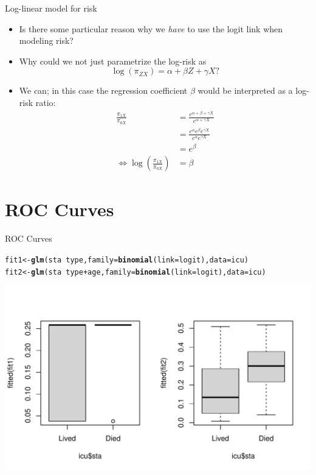 \documentclass[10pt,handout]{beamer}\usepackage[]{graphicx}\usepackage[]{color}
\makeatletter
\def\maxwidth{ %
  \ifdim\Gin@nat@width>\linewidth
    \linewidth
  \else
    \Gin@nat@width
  \fi
}
\newcommand{\hlopt}[1]{\textcolor[rgb]{0,0,0}{#1}}%
\newcommand{\hlstd}[1]{\textcolor[rgb]{0.345,0.345,0.345}{#1}}%
\newcommand{\hlkwb}[1]{\textcolor[rgb]{0.69,0.353,0.396}{#1}}%
\newcommand{\hlkwc}[1]{\textcolor[rgb]{0.333,0.667,0.333}{#1}}%
\newcommand{\hlkwd}[1]{\textcolor[rgb]{0.737,0.353,0.396}{\textbf{#1}}}%
\newenvironment{kframe}{%
 \def\at@end@of@kframe{}%
 \ifinner\ifhmode%
  \def\at@end@of@kframe{\end{minipage}}%
  \begin{minipage}{\columnwidth}%
 \fi\fi%
 \def\FrameCommand##1{\hskip\@totalleftmargin \hskip-\fboxsep
 \colorbox{shadecolor}{##1}\hskip-\fboxsep
     \hskip-\linewidth \hskip-\@totalleftmargin \hskip\columnwidth}%
 \MakeFramed {\advance\hsize-\width
   \@totalleftmargin\z@ \linewidth\hsize
   \@setminipage}}%
 {\par\unskip\endMakeFramed%
 \at@end@of@kframe}
\newenvironment{knitrout}{}{} %
\makeatother
\begin{document}
\begin{frame}[fragile]{Log-linear model for risk}
	\begin{itemize}
		\item Is there some particular reason why we \textit{have} to use the logit link when modeling risk?
		\item Why could we not just parametrize the log-risk as
		$$
		\log(\pi_{ZX}) = \alpha + \beta Z + \gamma X ?
		$$
		\item We can; in this case the regression coefficient $\beta$ would be interpreted as a log-risk ratio:
		$$\begin{aligned}
		\frac{\pi_{1 X}}{\pi_{0 X}} &=\frac{e^{\alpha+\beta+\gamma X}}{e^{\alpha+\gamma X}} \\
		&=\frac{e^{\alpha} e^{\beta} e^{\gamma X}}{e^{\alpha} e^{\gamma X}} \\
		&=e^{\beta} \\
		\Leftrightarrow \log \left(\frac{\pi_{1 X}}{\pi_{0 X}}\right) &=\beta
		\end{aligned}$$
	\end{itemize}
\end{frame}

\section{ROC Curves}

\begin{frame}[fragile]{ROC Curves}
\begin{knitrout}\tiny
{}\color{fgcolor}\begin{kframe}
\begin{alltt}
\hlstd{fit1} \hlkwb{<-} \hlkwd{glm}\hlstd{(sta} \hlopt{~} \hlstd{type,} \hlkwc{family}\hlstd{=}\hlkwd{binomial}\hlstd{(}\hlkwc{link}\hlstd{=logit),} \hlkwc{data}\hlstd{=icu)}
\hlstd{fit2} \hlkwb{<-} \hlkwd{glm}\hlstd{(sta} \hlopt{~} \hlstd{type} \hlopt{+} \hlstd{age,} \hlkwc{family}\hlstd{=}\hlkwd{binomial}\hlstd{(}\hlkwc{link}\hlstd{=logit),} \hlkwc{data}\hlstd{=icu)}
\end{alltt}
\end{kframe}

{\centering \includegraphics[width=\maxwidth]{figure/unnamed-chunk-49-1} 

}


\end{knitrout}
\end{frame}
\end{document}
